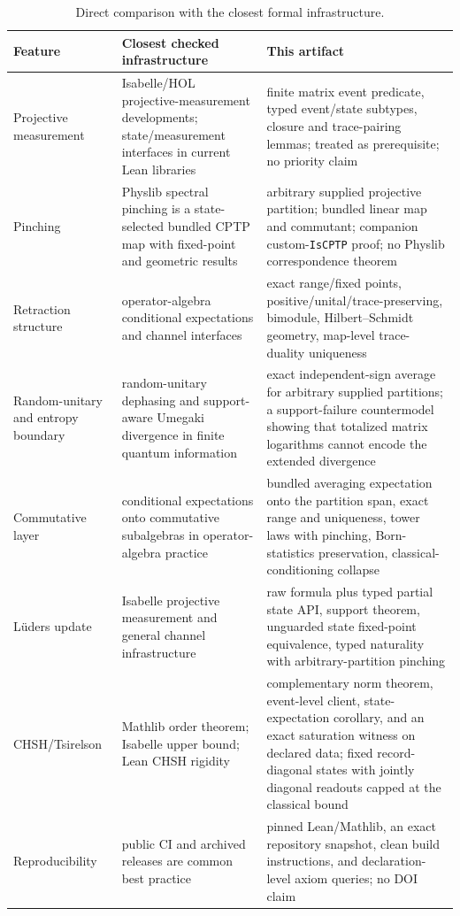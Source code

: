 \documentclass[11pt]{article}
\renewcommand{\_}{\textunderscore\allowbreak}
\theoremstyle{remark}
\begin{document}
\begin{table}[ht]
\centering
\scriptsize
\begin{tabular}{@{}L{2.1cm}L{4.25cm}L{6.0cm}@{}}
\toprule
Feature & Closest checked infrastructure & This artifact \\
\midrule
Projective measurement & Isabelle/HOL projective-measurement developments;
state/measurement interfaces in current Lean libraries & finite matrix event
predicate, typed event/state subtypes, closure and trace-pairing lemmas; treated
as prerequisite; no priority claim \\
Pinching & Physlib spectral pinching is a state-selected bundled CPTP map with
fixed-point and geometric results & arbitrary supplied projective partition;
bundled linear map and commutant; companion custom-\texttt{IsCPTP} proof; no
Physlib correspondence theorem \\
Retraction structure & operator-algebra conditional expectations and channel
interfaces & exact range/fixed points, positive/unital/trace-preserving,
bimodule, Hilbert--Schmidt geometry, map-level trace-duality uniqueness \\
Random-unitary and entropy boundary & random-unitary dephasing and
support-aware Umegaki divergence in finite quantum information & exact
independent-sign average for arbitrary supplied partitions; a support-failure
countermodel showing that totalized matrix logarithms cannot encode the
extended divergence \\
Commutative layer & conditional expectations onto commutative subalgebras in
operator-algebra practice & bundled averaging expectation onto the partition
span, exact range and uniqueness, tower laws with pinching, Born-statistics
preservation, classical-conditioning collapse \\
L\"uders update & Isabelle projective measurement and general channel
infrastructure & raw formula plus typed partial state API, support theorem,
unguarded state fixed-point equivalence, typed naturality with
arbitrary-partition pinching \\
CHSH/\allowbreak Tsirelson & Mathlib order theorem; Isabelle upper bound; Lean CHSH
rigidity & complementary norm theorem, event-level client, state-expectation
corollary, and an exact saturation witness on declared data; fixed
record-diagonal states with jointly diagonal readouts capped at the classical
bound \\
Reproducibility & public CI and archived releases are common best practice &
pinned Lean/Mathlib, an exact repository snapshot, clean build instructions,
and declaration-level axiom queries; no DOI claim \\
\bottomrule
\end{tabular}
\caption{Direct comparison with the closest formal infrastructure.}
\label{tab:comparison}
\end{table}
\end{document}
